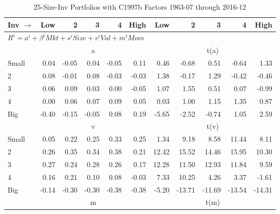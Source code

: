 
\begin{table}[!ht]
\centering
\caption{25-Size-Inv Portfolios with C1997b Factors 1963-07 through 2016-12}
\begin{tabular}{lrrrrrrrrrr}
  \toprule
    Inv $\rightarrow$ & Low & 2 & 3 & 4 & High & Low & 2 & 3 & 4 & High \\ 
  \midrule
  \multicolumn{11}{l}{$R^i=a^i+\beta^iMkt+s^iSize+v^iVal+m^iMom$} \\

  
    
      & \multicolumn{5}{c}{a} & \multicolumn{5}{c}{t(a)}
    
    \\
      \cmidrule(r){2-6} \cmidrule(r){7-11}

    Small   & 0.04  & -0.05  & 0.04  & -0.05  & 0.11  & 0.46  & -0.68  & 0.51  & -0.64  & 1.33  \\
         2  & 0.08  & -0.01  & 0.08  & -0.03  & -0.03  & 1.38  & -0.17  & 1.29  & -0.42  & -0.46  \\
         3  & 0.06  & 0.09  & 0.03  & 0.00  & -0.05  & 1.07  & 1.55  & 0.51  & 0.07  & -0.99  \\
         4  & 0.00  & 0.06  & 0.07  & 0.09  & 0.05  & 0.03  & 1.00  & 1.15  & 1.35  & 0.87  \\
    Big     & -0.40  & -0.15  & -0.05  & 0.08  & 0.19  & -5.65  & -2.52  & -0.74  & 1.05  & 2.59  \\

  
    
      & \multicolumn{5}{c}{v} & \multicolumn{5}{c}{t(v)}
    
    \\
      \cmidrule(r){2-6} \cmidrule(r){7-11}

    Small   & 0.05  & 0.22  & 0.25  & 0.33  & 0.25  & 1.34  & 9.18  & 8.58  & 11.44  & 8.11  \\
         2  & 0.26  & 0.35  & 0.34  & 0.38  & 0.21  & 12.42  & 15.52  & 14.46  & 15.95  & 10.30  \\
         3  & 0.27  & 0.24  & 0.28  & 0.26  & 0.17  & 12.28  & 11.50  & 12.93  & 11.84  & 9.59  \\
         4  & 0.16  & 0.21  & 0.10  & 0.08  & -0.03  & 7.33  & 10.25  & 4.26  & 3.37  & -1.61  \\
    Big     & -0.14  & -0.30  & -0.30  & -0.38  & -0.38  & -5.20  & -13.71  & -11.69  & -13.54  & -14.31  \\

  
    
      & \multicolumn{5}{c}{m} & \multicolumn{5}{c}{t(m)}
    

\end{tabular}
\end{table}
